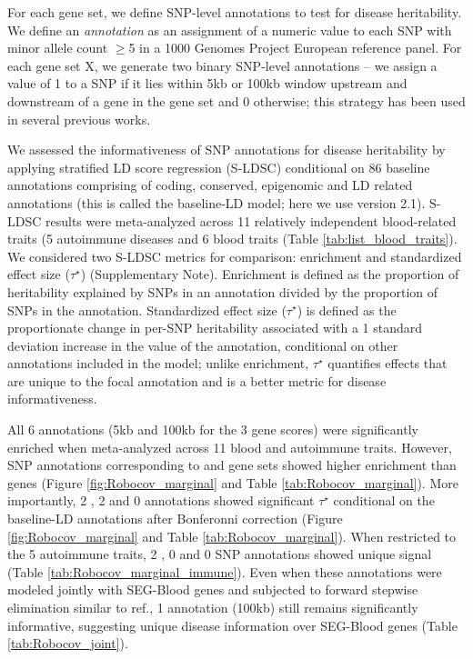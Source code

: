 For each gene set, we define  SNP-level annotations to test for disease heritability. We define an \emph{annotation} as an assignment of a numeric value to each SNP with minor allele count $\geq$5 in a 1000 Genomes Project European reference panel\cite{1000G2015, Finucane2015}. For each gene set X, we generate two binary SNP-level annotations -- we assign a value of 1 to a SNP if it lies within 5kb or 100kb window upstream and downstream of a gene in the gene set and 0 otherwise; this strategy has been used in several previous works\cite{Finucane2018, Kim2019, deLeeuw2015}.

We assessed the informativeness of SNP annotations for disease heritability by applying stratified LD score regression (S-LDSC)\cite{Finucane2015} conditional on 86 baseline annotations comprising of coding, conserved, epigenomic and LD related annotations (this is called the baseline-LD model; here we use version 2.1\cite{gazal2017}). S-LDSC results were meta-analyzed across 11 relatively independent blood-related traits (5 autoimmune diseases and 6 blood traits (Table \ref{tab:list_blood_traits}).  We considered two S-LDSC metrics for comparison: enrichment and standardized effect size ($\tau^{\star}$) (Supplementary Note).  Enrichment is defined as the proportion of heritability explained by SNPs in an annotation divided by the proportion of SNPs in the annotation\cite{Finucane2015}. Standardized effect size ($\tau^{\star}$) is defined as the proportionate change in per-SNP heritability associated with a 1 standard deviation increase in the value of the annotation, conditional on other annotations included in the model\cite{gazal2017, Hormozdiari2018}; unlike enrichment, $\tau^{\star}$ quantifies effects that are unique to the focal annotation and is a better metric for disease informativeness\cite{dey2019, Kim2019, Finucane2018, Hormozdiari2018}. 


All $6$ annotations (5kb and 100kb for the 3 gene scores) were significantly enriched when meta-analyzed across 11 blood and autoimmune traits. However, SNP annotations corresponding to \Robospan{} and \pRobospan{} gene sets showed higher enrichment than  \Corspan{} genes (Figure \ref{fig:Robocov_marginal} and Table \ref{tab:Robocov_marginal}). More importantly, 2 \Robospan{}, 2 \pRobospan{} and 0 \Corspan{} annotations showed significant $\tau^{\star}$ conditional on the baseline-LD annotations after Bonferonni correction (Figure \ref{fig:Robocov_marginal} and Table \ref{tab:Robocov_marginal}). When restricted to the 5 autoimmune traits,  2 \Robospan{}, 0 \pRobospan{} and 0 \Corspan{} SNP annotations showed unique signal (Table \ref{tab:Robocov_marginal_immune}). Even when these annotations were modeled jointly with SEG-Blood\cite{Finucane2018} genes and subjected to forward stepwise elimination similar to ref.\cite{Kim2019, dey2019}, 1 \Robospan{} annotation (100kb) still remains significantly informative, suggesting unique disease information over SEG-Blood genes (Table \ref{tab:Robocov_joint}). 

